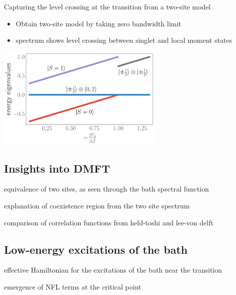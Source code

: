\documentclass[8pt,aspectratio=169]{beamer}
\newcommand{\nitem}{\item[\ding{51}]}
\begin{document}
\begin{frame}{Capturing the level crossing at the transition from a two-site model}

\begin{itemize}
	\nitem Obtain two-site model by taking \alert{zero bandwidth} limit\\[10pt]
	\nitem spectrum shows \alert{level crossing} between singlet and local moment states
\end{itemize}

\vspace*{\fill}

\includegraphics[width=0.6\textwidth]{twosite_spectrum.pdf}
\end{frame}

\begin{frame}{}
\section{Insights into DMFT}
\end{frame}
\begin{frame}{equivalence of two sites, as seen through the bath spectral function}
\end{frame}
\begin{frame}{explanation of coexistence region from the two site spectrum}
\end{frame}
\begin{frame}{comparison of correlation functions from held-toshi and lee-von delft}
\end{frame}

\begin{frame}{}
\section{Low-energy excitations of the bath}
\end{frame}
\begin{frame}{effective Hamiltonian for the excitations of the bath near the transition}
\end{frame}
\begin{frame}{emergence of NFL terms at the critical point}
\end{frame}
\end{document}
